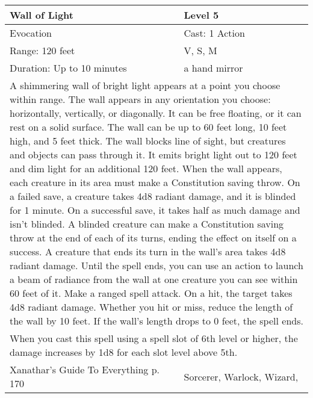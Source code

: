 \documentclass[11pt]{report}
\begin{document}
\begin{table}[H]
	\begin{tabular}{||p{6cm}|p{6cm}||}
		\hline\hline
		\bf{Wall of Light} & Level 5\\ \hline
		Evocation & Cast: 1 Action\\ \hline
		Range: 120 feet & V, S, M\\ \hline
		Duration: Up to 10 minutes & a hand mirror\\ \hline
		\multicolumn{2}{||p{12cm}||}{A shimmering wall of bright light appears at a point you choose within range. The wall appears in any orientation you choose: horizontally, vertically, or diagonally. It can be free floating, or it can rest on a solid surface. The wall can be up to 60 feet long, 10 feet high, and 5 feet thick. The wall blocks line of sight, but creatures and objects can pass through it. It emits bright light out to 120 feet and dim light for an additional 120 feet.
When the wall appears, each creature in its area must make a Constitution saving throw. On a failed save, a creature takes 4d8 radiant damage, and it is blinded for 1 minute. On a successful save, it takes half as much damage and isn’t blinded. A blinded creature can make a Constitution saving throw at the end of each of its turns, ending the effect on itself on a success.
A creature that ends its turn in the wall’s area takes 4d8 radiant damage.
Until the spell ends, you can use an action to launch a beam of radiance from the wall at one creature you can see within 60 feet of it. Make a ranged spell attack. On a hit, the target takes 4d8 radiant damage. Whether you hit or miss, reduce the length of the wall by 10 feet. If the wall’s length drops to 0 feet, the spell ends.}\\ \hline
		\multicolumn{2}{||p{12cm}||}{When you cast this spell using a spell slot of 6th level or higher, the damage increases by 1d8 for each slot level above 5th.}\\ \hline
Xanathar's Guide To Everything p. 170 & Sorcerer, Warlock, Wizard, \\ \hline\hline
	\end{tabular}
\end{table}
\end{document}
